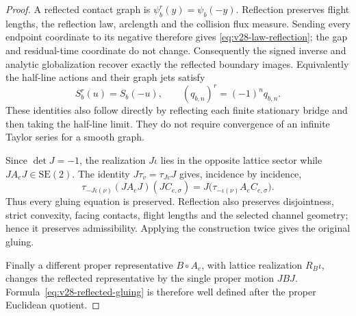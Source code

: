 \begin{proof}
A reflected contact graph is \(\psi_b^r(y)=\psi_b(-y)\).  Reflection preserves
flight lengths, the reflection law, arclength and the collision flux measure.
Sending every endpoint coordinate to its negative therefore gives
\eqref{eq:v28-law-reflection}; the gap and residual-time coordinate do not
change.  Consequently the signed inverse and analytic globalization recover
exactly the reflected boundary images.  Equivalently the half-line actions
and their graph jets satisfy
\begin{equation}\label{eq:v28-reflected-jets}
 S_b^r(u)=S_b(-u),\qquad
 (q_{b,n})^r=(-1)^nq_{b,n}.
\end{equation}
These identities also follow directly by reflecting each finite stationary
bridge and then taking the half-line limit.  They do not require convergence
of an infinite Taylor series for a smooth graph.

Since \(\det J=-1\), the realization \(J\iota\) lies in the opposite lattice
sector while \(JA_eJ\in\mathrm{SE}(2)\).  The identity
\(J\tau_v=\tau_{Jv}J\) gives, incidence by incidence,
\begin{equation}\label{eq:v28-incidence-equivariance}
 \tau_{-J\iota(\nu)}(JA_eJ)(JC_{e,\sigma})
       =J\bigl(\tau_{-\iota(\nu)}A_eC_{e,\sigma}\bigr).
\end{equation}
Thus every gluing equation is preserved.  Reflection also preserves
disjointness, strict convexity, facing contacts, flight lengths and the
selected channel geometry; hence it preserves admissibility.  Applying the
construction twice gives the original gluing.

Finally a different proper representative \(B\circ A_e\), with lattice
realization \(R_B\iota\), changes the reflected representative by the single
proper motion \(JBJ\).  Formula~\eqref{eq:v28-reflected-gluing} is therefore
well defined after the proper Euclidean quotient.
\end{proof}

